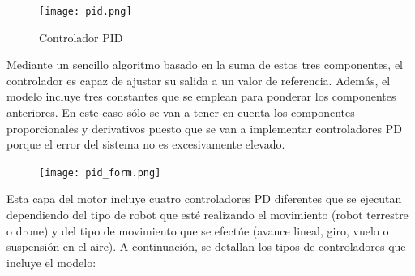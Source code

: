 \clearpage
\begin{figure}[h!]
    \centering
    \texttt{[image: pid.png]}
    \caption[Controlador PID]{Controlador PID \footnotemark}
    \label{fig:pid}
\end{figure}

Mediante un sencillo algoritmo basado en la suma de estos tres componentes, el controlador es capaz de ajustar su salida a un valor de referencia. Además, el modelo incluye tres constantes que se emplean para ponderar los componentes anteriores. En este caso sólo se van a tener en cuenta los componentes proporcionales y derivativos puesto que se van a implementar controladores PD  porque el error del sistema no es excesivamente elevado.\newline 

\begin{figure}[h!]
    \centering
    \texttt{[image: pid\_form.png]}
    \label{fig:pid_form}
\end{figure}

Esta capa del motor incluye cuatro controladores PD diferentes que se ejecutan dependiendo del tipo de robot que esté realizando el movimiento (robot terrestre o drone) y del tipo de movimiento que se efectúe (avance lineal, giro, vuelo o suspensión en el aire). A continuación, se detallan los tipos de controladores que incluye el modelo:

